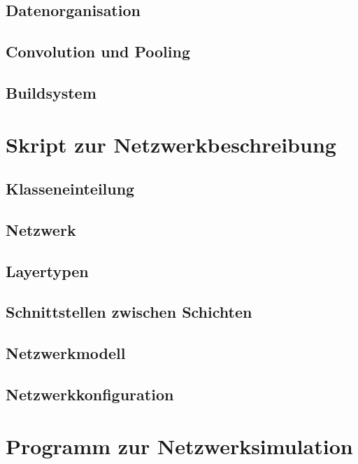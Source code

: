 \documentclass[../main.tex]{subfiles}
\begin{document}
\subsection{Datenorganisation}

\subsection{Convolution und Pooling}

\subsection{Buildsystem}



\section{Skript zur Netzwerkbeschreibung}

\subsection{Klasseneinteilung}

\subsection{Netzwerk}

\subsection{Layertypen}

\subsection{Schnittstellen zwischen Schichten}

\subsection{Netzwerkmodell}

\subsection{Netzwerkkonfiguration}



\section{Programm zur Netzwerksimulation}
\end{document}

